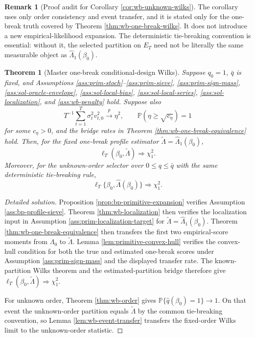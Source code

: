 \documentclass[12pt]{article}
\numberwithin{equation}{section}
\newtheorem{theorem}{Theorem}
\theoremstyle{definition}
\newtheorem{remark}{Remark}
\newcommand{\Pp}{\mathbb P}
\begin{document}
\begin{remark}[Proof audit for Corollary \ref{cor:wb-unknown-wilks}]
The corollary uses only order consistency and event transfer, and it is stated
only for the one-break truth covered by Theorem \ref{thm:wb-one-break-wilks}.
It does not introduce a new empirical-likelihood expansion.  The deterministic
tie-breaking convention is essential: without it, the selected partition on
\(E_T\) need not be literally the same measurable object as
\(\widehat\Lambda_1(\beta_0)\).
\end{remark}
\begin{theorem}[Master one-break conditional-design Wilks]
\label{thm:master-one-break-wilks}
Suppose \(q_0=1\), \(\bar q\) is fixed, and Assumptions
\ref{ass:prim-stoch}--\ref{ass:prim-sieve}, \ref{ass:prim-sign-mass},
\ref{ass:sol-oracle-envelope}, \ref{ass:sol-local-bias},
\ref{ass:sol-local-series}, \ref{ass:sol-localization}, and
\ref{ass:wb-penalty} hold.  Suppose also
\[
    T^{-1}\sum_{t=1}^T\sigma_t^2v_{t,0}^2\xrightarrow{p}\eta^2,
    \qquad
    \Pp(\eta\geq\sqrt{c_\eta})=1
\]
for some \(c_\eta>0\), and the bridge rates in Theorem
\ref{thm:wb-one-break-equivalence} hold.  Then, for the fixed one-break
profile estimator \(\widetilde\Lambda=\widehat\Lambda_1(\beta_0)\),
\[
    \ell_T(\beta_0,\widetilde\Lambda)\Rightarrow\chi_1^2.
\]
Moreover, for the unknown-order selector over \(0\le q\le\bar q\) with the
same deterministic tie-breaking rule,
\[
    \ell_T\{\beta_0,\widehat\Lambda(\beta_0)\}\Rightarrow\chi_1^2.
\]
\end{theorem}

\begin{proof}[Detailed solution]
Proposition \ref{prop:bp-primitive-expansion} verifies Assumption
\ref{ass:bp-profile-sieve}.  Theorem \ref{thm:wb-localization} then verifies
the localization input in Assumption \ref{ass:prim-localization-target} for
\(\widetilde\Lambda=\widehat\Lambda_1(\beta_0)\).  Theorem
\ref{thm:wb-one-break-equivalence} then transfers the first two empirical-score
moments from \(\Lambda_0\) to \(\widetilde\Lambda\).  Lemma
\ref{lem:primitive-convex-hull} verifies the convex-hull condition for both the
true and estimated one-break scores under Assumption \ref{ass:prim-sign-mass}
and the displayed transfer rate.  The known-partition Wilks theorem and the
estimated-partition bridge therefore give
\(\ell_T(\beta_0,\widetilde\Lambda)\Rightarrow\chi_1^2\).

For unknown order, Theorem \ref{thm:wb-order} gives
\(\Pp\{\widehat q(\beta_0)=1\}\to1\).  On that event the unknown-order
partition equals \(\widetilde\Lambda\) by the common tie-breaking convention, so
Lemma \ref{lem:wb-event-transfer} transfers the fixed-order Wilks limit to the
unknown-order statistic.
\end{proof}
\end{document}
